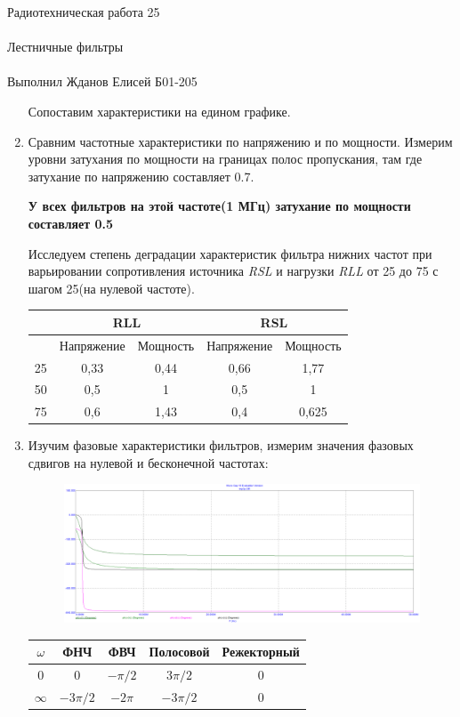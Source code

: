 \documentclass{astroedu-lab}
\begin{document}
\begin{problem}{\huge Радиотехническая работа 25\\\\Лестничные фильтры\\\\Выполнил Жданов Елисей Б01-205}
\begin{enumerate}
Сопоставим характеристики на едином графике.

\item Сравним частотные характеристики по напряжению и по мощности. Измерим уровни затухания по мощности на границах полос пропускания, там где затухание по напряжению составляет 0.7.

\textbf{У всех фильтров на этой частоте(1 МГц) затухание по мощности составляет 0.5}

Исследуем степень деградации характеристик фильтра нижних частот при варьировании сопротивления источника \textit{RSL} и нагрузки \textit{RLL} от 25 до 75 с шагом 25(на нулевой частоте).

\begin{center}
\begin{tabular}{|c|c|c|c|c|}
\hline 
 & \multicolumn{2}{c|}{RLL} & \multicolumn{2}{c|}{RSL} \\ 
\hline 
 & Напряжение & Мощность & Напряжение & Мощность \\ 
\hline 
25 & 0,33 & 0,44 & 0,66 & 1,77 \\ 
\hline 
50 & 0,5 & 1 & 0,5 & 1 \\ 
\hline 
75 & 0,6 & 1,43 & 0,4 & 0,625 \\ 
\hline 
\end{tabular} 
\end{center}

\item Изучим фазовые характеристики фильтров, измерим значения фазовых сдвигов на нулевой и бесконечной частотах:

\newpage

\begin{figure}[!h]
	\centering
	\includegraphics[width=1\textwidth]{2.4.png}
	\label{fig:boiler}
\end{figure}

\begin{center}
\begin{tabular}{|c|c|c|c|c|}
\hline 
$\omega$ & ФНЧ & ФВЧ & Полосовой & Режекторный \\ 
\hline 
0 & 0 & $-\pi/2$ & $3\pi/2$ & 0 \\ 
\hline 
$\infty$ & $-3\pi/2$ & $-2\pi$ & $-3\pi/2$ & 0 \\ 
\hline 
\end{tabular}
\end{center} 


\end{enumerate}
\end{problem}
\end{document}
